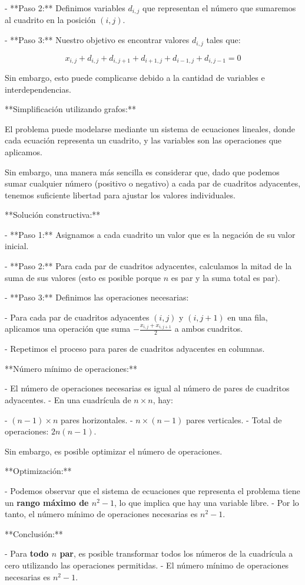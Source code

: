 \documentclass[11pt]{scrartcl}
\begin{document}
\begin{problem}
\begin{hint}
\begin{solu}
- **Paso 2:** Definimos variables $d_{i,j}$ que representan el número que sumaremos al cuadrito en la posición $(i, j)$.

- **Paso 3:** Nuestro objetivo es encontrar valores $d_{i,j}$ tales que:

  $$
  x_{i,j} + d_{i,j} + d_{i,j+1} + d_{i+1,j} + d_{i-1,j} + d_{i,j-1} = 0
  $$

  Sin embargo, esto puede complicarse debido a la cantidad de variables e interdependencias.

**Simplificación utilizando grafos:**

El problema puede modelarse mediante un sistema de ecuaciones lineales, donde cada ecuación representa un cuadrito, y las variables son las operaciones que aplicamos.

Sin embargo, una manera más sencilla es considerar que, dado que podemos sumar cualquier número (positivo o negativo) a cada par de cuadritos adyacentes, tenemos suficiente libertad para ajustar los valores individuales.

**Solución constructiva:**

- **Paso 1:** Asignamos a cada cuadrito un valor que es la negación de su valor inicial.

- **Paso 2:** Para cada par de cuadritos adyacentes, calculamos la mitad de la suma de sus valores (esto es posible porque $n$ es par y la suma total es par).

- **Paso 3:** Definimos las operaciones necesarias:

  - Para cada par de cuadritos adyacentes $(i, j)$ y $(i, j+1)$ en una fila, aplicamos una operación que suma $-\frac{x_{i,j} + x_{i,j+1}}{2}$ a ambos cuadritos.

  - Repetimos el proceso para pares de cuadritos adyacentes en columnas.

**Número mínimo de operaciones:**

- El número de operaciones necesarias es igual al número de pares de cuadritos adyacentes.
- En una cuadrícula de $n \times n$, hay:

  - $(n-1) \times n$ pares horizontales.
  - $n \times (n-1)$ pares verticales.
  - Total de operaciones: $2n(n - 1)$.

Sin embargo, es posible optimizar el número de operaciones.

**Optimización:**

- Podemos observar que el sistema de ecuaciones que representa el problema tiene un \textbf{rango máximo de $n^2 - 1$}, lo que implica que hay una variable libre.
- Por lo tanto, el número mínimo de operaciones necesarias es $n^2 - 1$.

**Conclusión:**

- Para \textbf{todo $n$ par}, es posible transformar todos los números de la cuadrícula a cero utilizando las operaciones permitidas.
- El número mínimo de operaciones necesarias es $n^2 - 1$.

\end{solu}
\end{hint}
\end{problem}
\end{document}
